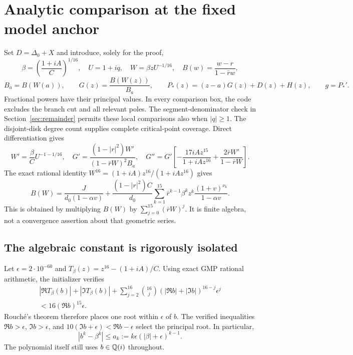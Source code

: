 \documentclass[11pt,a4paper]{article}
\begin{document}
\section{Analytic comparison at the fixed model anchor}\label{sec:model}
Set $D=\Delta_0+X$ and introduce, solely for the proof,
\[
 \beta=\left(\frac{1+iA}{C}\right)^{1/16},\quad U=1+iq,\quad
 W=\beta zU^{-1/16},\quad B(w)=\frac{w-r}{1-\bar r w},
\]
\[
 B_a=B(W(a)),\qquad G(z)=\frac{B(W(z))}{B_a},\qquad
 P_*(z)=(z-a)G(z)+D(z)+H(z),\qquad g=P_*'.
\]
Fractional powers have their principal values. In every comparison box, the
code excludes the branch cut and all relevant poles. The segment-denominator
check in Section~\ref{sec:remainder} permits these local comparisons also when
$|q|\ge1$. The disjoint-disk degree count supplies complete critical-point
coverage.
Direct differentiation gives
\[
 W'=\frac{\beta}{C}U^{-1-1/16},\quad
 G'=\frac{(1-|r|^2)W'}{(1-\bar rW)^2B_a},\quad
 G''=G'\left[-\frac{17iAz^{15}}{1+iAz^{16}}
                    +\frac{2\bar rW'}{1-\bar rW}\right].
\]
The exact rational identity $W^{16}=(1+iA)z^{16}/(1+iAz^{16})$ gives
\begin{equation}\label{eq:rationalization}
 B(W)=\frac{J}{d_0(1-\alpha v)}+
 \frac{(1-|r|^2)C}{d_0}\sum_{k=1}^{15}\bar r^{k-1}\beta^kz^k
                       \frac{(1+v)^{\nu_k}}{1-\alpha v}.
\end{equation}
This is obtained by multiplying $B(W)$ by
$\sum_{j=0}^{15}(\bar rW)^j$. It is finite algebra, not a convergence assertion
about that geometric series.

\subsection{The algebraic constant is rigorously isolated}
Let $\epsilon=2\cdot10^{-60}$ and $T_\beta(z)=z^{16}-(1+iA)/C$.
Using exact GMP rational arithmetic, the initializer verifies
\begin{multline*}
 |\Re T_\beta(b)|+|\Im T_\beta(b)|+
 \sum_{j=2}^{16}\binom{16}{j}(|\Re b|+|\Im b|)^{16-j}\epsilon^j\\
 <16(\Re b)^{15}\epsilon.
\end{multline*}
Rouch\'e's theorem therefore places one root within $\epsilon$ of $b$.
The verified inequalities $\Re b>\epsilon$, $\Im b>\epsilon$, and
$10(\Im b+\epsilon)<\Re b-\epsilon$ select the principal root. In particular,
\[
 |b^k-\beta^k|\le a_k:=k\epsilon(|\beta|+\epsilon)^{k-1}.
\]
The polynomial itself still uses $b\in\mathbb Q(i)$ throughout.
\end{document}
